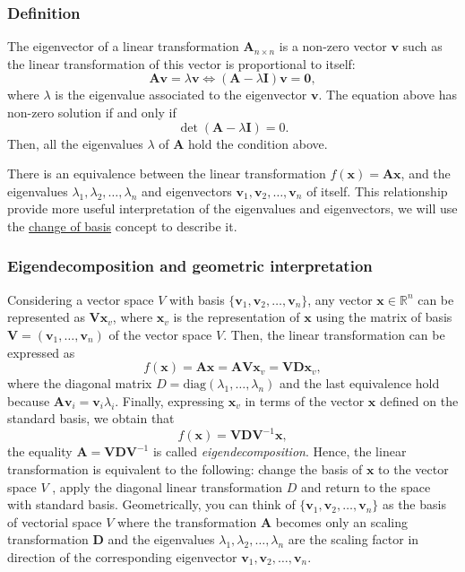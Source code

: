 \documentclass[]{book}
\begin{document}
\hypertarget{definition}{%
\subsubsection{Definition}\label{definition}}

The eigenvector of a linear transformation \(\mathbf{A}_{n\times n}\) is a non-zero vector
\(\mathbf{v}\)
such as the linear transformation of this vector is proportional to itself:
\[\mathbf{A}\mathbf{v} = \lambda \mathbf{v} \iff (\mathbf{A}-\lambda\mathbf{I})\mathbf{v} = \mathbf{0},\]
where \(\lambda\) is the eigenvalue associated to the eigenvector \(\mathbf{v}\). The
equation above has non-zero solution if and only if
\[\det(\mathbf{A}-\lambda\mathbf{I}) = 0.\]
Then, all the eigenvalues \(\lambda\) of \(\mathbf{A}\) hold the condition above.

There is an equivalence between the linear transformation \(f(\mathbf{x}) = \mathbf{A}\mathbf{x}\),
and the eigenvalues \(\lambda_1, \lambda_2, \dots, \lambda_n\) and eigenvectors
\(\mathbf{v}_1, \mathbf{v}_2, \dots, \mathbf{v}_n\) of itself. This relationship provide more
useful
interpretation of the eigenvalues and eigenvectors, we will use the
\href{../../mathematics/linear-algebra/10-linear-transformation}{change of basis}
concept to describe it.

\hypertarget{eigendecomposition-and-geometric-interpretation}{%
\subsubsection{Eigendecomposition and geometric interpretation}\label{eigendecomposition-and-geometric-interpretation}}

Considering a vector space \(V\) with basis \(\{\mathbf{v}_1, \mathbf{v}_2, \dots, \mathbf{v}_n\}\),
any vector \(\mathbf{x} \in \mathbb{R}^n\) can be represented as \(\mathbf{V}\mathbf{x}_v\),
where \(\mathbf{x}_v\) is the representation of \(\mathbf{x}\) using the matrix of basis
\(\mathbf{V}=(\mathbf{v}_1, \dots, \mathbf{v}_n)\) of the vector space \(V\). Then, the linear
transformation can be expressed as
\[f(\mathbf{x}) = \mathbf{A}\mathbf{x} = \mathbf{A}\mathbf{V}\mathbf{x}_v = \mathbf{V}\mathbf{D}\mathbf{x}_v,\]
where the diagonal matrix \(D=\text{diag}(\lambda_1, \dots, \lambda_n)\) and the last
equivalence hold because \(\mathbf{A}\mathbf{v}_i=\mathbf{v}_i\lambda_i\). Finally, expressing
\(\mathbf{x}_v\) in terms of the vector \(\mathbf{x}\) defined on the standard basis, we
obtain that
\[f(\mathbf{x}) = \mathbf{V}\mathbf{D}\mathbf{V}^{-1}\mathbf{x},\]
the equality \(\mathbf{A}=\mathbf{V}\mathbf{D}\mathbf{V}^{-1}\) is called \emph{eigendecomposition}.
Hence, the linear transformation is equivalent to the following:
change the basis of \(\mathbf{x}\) to the vector space \(V\)
, apply the diagonal linear transformation \(D\) and return to the space with
standard basis. Geometrically, you can think of
\(\{\mathbf{v}_1, \mathbf{v}_2, \dots, \mathbf{v}_n\}\) as the basis of vectorial space \(V\) where
the transformation \(\mathbf{A}\) becomes only an scaling transformation \(\mathbf{D}\) and the
eigenvalues \(\lambda_1, \lambda_2, \dots, \lambda_n\) are the scaling factor in
direction of the corresponding eigenvector \(\mathbf{v}_1, \mathbf{v}_2, \dots, \mathbf{v}_n\).
\end{document}
